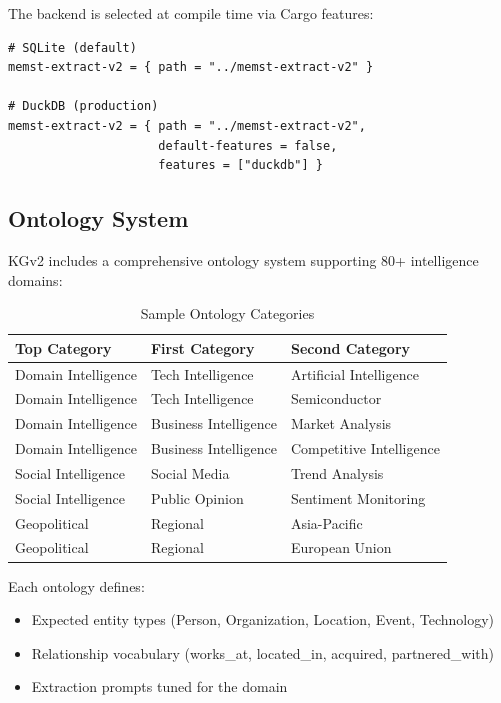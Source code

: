The backend is selected at compile time via Cargo features:

\begin{verbatim}
# SQLite (default)
memst-extract-v2 = { path = "../memst-extract-v2" }

# DuckDB (production)
memst-extract-v2 = { path = "../memst-extract-v2", 
                     default-features = false, 
                     features = ["duckdb"] }
\end{verbatim}

\subsection{Ontology System}

KGv2 includes a comprehensive ontology system supporting 80+ intelligence domains:

\begin{table}[ht]
\centering
\caption{Sample Ontology Categories}
\begin{tabular}{@{}lll@{}}
\toprule
\textbf{Top Category} & \textbf{First Category} & \textbf{Second Category} \\
\midrule
Domain Intelligence & Tech Intelligence & Artificial Intelligence \\
Domain Intelligence & Tech Intelligence & Semiconductor \\
Domain Intelligence & Business Intelligence & Market Analysis \\
Domain Intelligence & Business Intelligence & Competitive Intelligence \\
Social Intelligence & Social Media & Trend Analysis \\
Social Intelligence & Public Opinion & Sentiment Monitoring \\
Geopolitical & Regional & Asia-Pacific \\
Geopolitical & Regional & European Union \\
\bottomrule
\end{tabular}
\label{tab:ontologies}
\end{table}

Each ontology defines:
\begin{itemize}
    \item Expected entity types (Person, Organization, Location, Event, Technology)
    \item Relationship vocabulary (works\_at, located\_in, acquired, partnered\_with)
    \item Extraction prompts tuned for the domain
\end{itemize}

